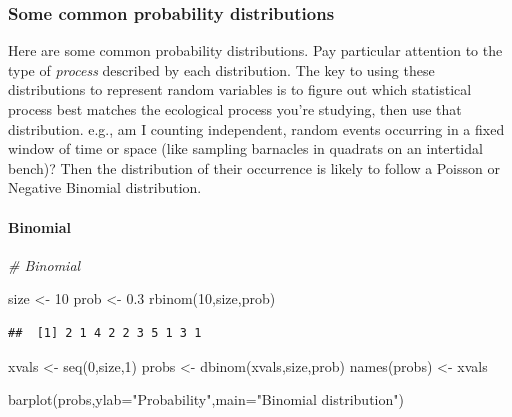\documentclass[
]{article}
\newenvironment{Shaded}{\begin{snugshade}}{\end{snugshade}}
\newcommand{\AttributeTok}[1]{\textcolor[rgb]{0.77,0.63,0.00}{#1}}
\newcommand{\CommentTok}[1]{\textcolor[rgb]{0.56,0.35,0.01}{\textit{#1}}}
\newcommand{\DecValTok}[1]{\textcolor[rgb]{0.00,0.00,0.81}{#1}}
\newcommand{\FloatTok}[1]{\textcolor[rgb]{0.00,0.00,0.81}{#1}}
\newcommand{\FunctionTok}[1]{\textcolor[rgb]{0.00,0.00,0.00}{#1}}
\newcommand{\NormalTok}[1]{#1}
\newcommand{\OtherTok}[1]{\textcolor[rgb]{0.56,0.35,0.01}{#1}}
\newcommand{\StringTok}[1]{\textcolor[rgb]{0.31,0.60,0.02}{#1}}
\begin{document}
\hypertarget{some-common-probability-distributions}{%
\subsubsection{Some common probability
distributions}\label{some-common-probability-distributions}}

Here are some common probability distributions. Pay particular attention
to the type of \emph{process} described by each distribution. The key to
using these distributions to represent random variables is to figure out
which statistical process best matches the ecological process you're
studying, then use that distribution. e.g., am I counting independent,
random events occurring in a fixed window of time or space (like
sampling barnacles in quadrats on an intertidal bench)? Then the
distribution of their occurrence is likely to follow a Poisson or
Negative Binomial distribution.

\hypertarget{binomial}{%
\paragraph{Binomial}\label{binomial}}

\begin{Shaded}
\begin{Highlighting}[]
\CommentTok{\# Binomial}

\NormalTok{size }\OtherTok{\textless{}{-}} \DecValTok{10}
\NormalTok{prob }\OtherTok{\textless{}{-}} \FloatTok{0.3}
\FunctionTok{rbinom}\NormalTok{(}\DecValTok{10}\NormalTok{,size,prob)}
\end{Highlighting}
\end{Shaded}

\begin{verbatim}
##  [1] 2 1 4 2 2 3 5 1 3 1
\end{verbatim}

\begin{Shaded}
\begin{Highlighting}[]
\NormalTok{xvals }\OtherTok{\textless{}{-}} \FunctionTok{seq}\NormalTok{(}\DecValTok{0}\NormalTok{,size,}\DecValTok{1}\NormalTok{)}
\NormalTok{probs }\OtherTok{\textless{}{-}} \FunctionTok{dbinom}\NormalTok{(xvals,size,prob)}
\FunctionTok{names}\NormalTok{(probs) }\OtherTok{\textless{}{-}}\NormalTok{ xvals}
               
\FunctionTok{barplot}\NormalTok{(probs,}\AttributeTok{ylab=}\StringTok{"Probability"}\NormalTok{,}\AttributeTok{main=}\StringTok{"Binomial distribution"}\NormalTok{)}
\end{Highlighting}
\end{Shaded}
\end{document}
